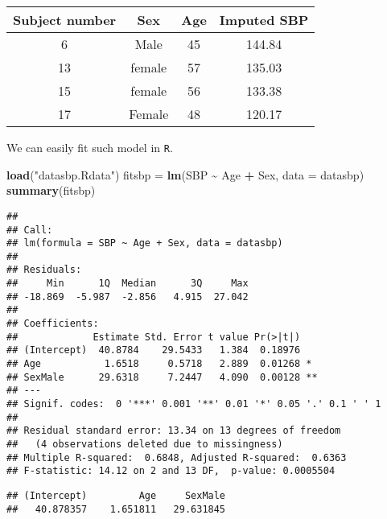 \documentclass[
]{article}
\newenvironment{Shaded}{\begin{snugshade}}{\end{snugshade}}
\newcommand{\CommentTok}[1]{\textcolor[rgb]{0.56,0.35,0.01}{\textit{#1}}}
\newcommand{\DataTypeTok}[1]{\textcolor[rgb]{0.13,0.29,0.53}{#1}}
\newcommand{\KeywordTok}[1]{\textcolor[rgb]{0.13,0.29,0.53}{\textbf{#1}}}
\newcommand{\NormalTok}[1]{#1}
\newcommand{\OperatorTok}[1]{\textcolor[rgb]{0.81,0.36,0.00}{\textbf{#1}}}
\newcommand{\StringTok}[1]{\textcolor[rgb]{0.31,0.60,0.02}{#1}}
\begin{document}
\begin{center}
\begin{tabular}{cccc}
Subject number & Sex & Age & Imputed SBP\\ \hline
6 & Male & 45 & 144.84\\
13 & female & 57 & 135.03\\
15 & female & 56 & 133.38\\
17 & Female & 48 & 120.17
\end{tabular}
\end{center}

We can easily fit such model in \texttt{R}.

\begin{Shaded}
\begin{Highlighting}[]
\KeywordTok{load}\NormalTok{(}\StringTok{"datasbp.Rdata"}\NormalTok{)}
\NormalTok{fitsbp =}\StringTok{ }\KeywordTok{lm}\NormalTok{(SBP }\OperatorTok{\textasciitilde{}}\StringTok{ }\NormalTok{Age }\OperatorTok{+}\StringTok{ }\NormalTok{Sex, }\DataTypeTok{data =}\NormalTok{ datasbp)}
\KeywordTok{summary}\NormalTok{(fitsbp)}
\end{Highlighting}
\end{Shaded}

\begin{verbatim}
## 
## Call:
## lm(formula = SBP ~ Age + Sex, data = datasbp)
## 
## Residuals:
##     Min      1Q  Median      3Q     Max 
## -18.869  -5.987  -2.856   4.915  27.042 
## 
## Coefficients:
##             Estimate Std. Error t value Pr(>|t|)   
## (Intercept)  40.8784    29.5433   1.384  0.18976   
## Age           1.6518     0.5718   2.889  0.01268 * 
## SexMale      29.6318     7.2447   4.090  0.00128 **
## ---
## Signif. codes:  0 '***' 0.001 '**' 0.01 '*' 0.05 '.' 0.1 ' ' 1
## 
## Residual standard error: 13.34 on 13 degrees of freedom
##   (4 observations deleted due to missingness)
## Multiple R-squared:  0.6848, Adjusted R-squared:  0.6363 
## F-statistic: 14.12 on 2 and 13 DF,  p-value: 0.0005504
\end{verbatim}

\begin{Shaded}
\end{Shaded}

\begin{verbatim}
## (Intercept)         Age     SexMale 
##   40.878357    1.651811   29.631845
\end{verbatim}
\end{document}
